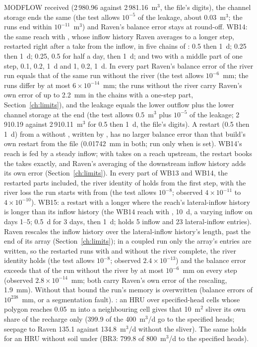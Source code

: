 MODFLOW received (2\,980.96 against 2\,981.16~m$^3$, the file's digits), the channel storage ends the same (the test
allows $10^{-5}$ of the leakage, about 0.03~m$^3$; the runs end within $10^{-11}$~m$^3$) and Raven's balance error stays
at round-off.
WB14: the same reach with , whose inflow history Raven averages to a longer step, restarted
right after a take from the inflow, in five chains of : 0.5 then 1~d; 0.25 then 1~d; 0.25, 0.5 for half a
day, then 1~d; and two with a middle part of one step, 0.1, 0.2, 1~d and 1, 0.2, 1~d. In every part Raven's balance error
of the river run equals that of the same run without the river (the test allows $10^{-6}$~mm; the runs differ by at most
$6\times10^{-14}$~mm; the runs without the river carry Raven's own error of up to 2.2~mm in the chains with a one-step
part, Section~\ref{ch:limits}), and the leakage equals the lower outflow plus the lower channel storage at the end (the
test allows 0.5~m$^3$ plus $10^{-5}$ of the leakage; 2\,910.19 against 2\,910.11~m$^3$ for 0.5 then 1~d, the file's
digits). A restart (0.5 then 1~d) from a  without , written by
, has no larger balance error than that build's own restart from the file (0.01742~mm in both; run
only when  is set). WB14's reach is fed by a steady inflow; with takes on a reach upstream, the
restart books the takes exactly, and Raven's averaging of the downstream inflow history adds its own error (Section~\ref{ch:limits}).
In every part of WB13 and WB14, the restarted parts included, the river identity of  holds from the
first step, with the river loss the run starts with from  (the test allows $10^{-8}$; observed
$4\times10^{-11}$ to $4\times10^{-10}$).
WB15: a restart with a longer  where the reach's lateral-inflow history is longer than its inflow history
(the WB14 reach with ,  10~d, a varying inflow on days 1--5; 0.5~d for 3
days, then 1~d;  holds 5 inflow and 23 lateral-inflow entries). Raven rescales the inflow history over
the lateral-inflow history's length, past the end of its array (Section~\ref{ch:limits}); in a coupled run only the
array's entries are written, so the restarted runs with and without the river complete, the river identity holds
(the test allows $10^{-8}$; observed $2.4\times10^{-13}$) and the balance error exceeds that of the run without the river
by at most $10^{-6}$~mm on every step (observed $2.8\times10^{-14}$~mm; both carry Raven's own error of the rescaling,
1.9~mm). Without that bound the run's memory is overwritten (balance errors of $10^{238}$~mm, or a segmentation fault).
: an HRU over specified-head cells whose polygon reaches 0.05~m into a
neighbouring cell gives that 10~m$^2$ sliver its own share of the recharge only (399.9 of the 400~m$^3$/d go to the
specified heads; seepage to Raven 135.1 against 134.8~m$^3$/d without the sliver). The same holds for an HRU without soil under  (BR3: 799.8 of 800~m$^3$/d to the specified heads).

